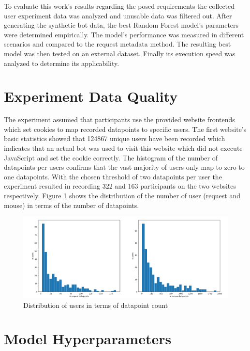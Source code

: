 \documentclass[
    fontsize=12pt,
    headings=small,
    parskip=half,           %
    bibliography=totoc,
    numbers=noenddot,       %
    open=any,               %
    final                   %
]{scrreprt}
\begin{document}
To evaluate this work's results regarding the posed requirements the collected user experiment data was analyzed and unusable data was filtered out. After generating the synthetic bot data, the best Random Forest model's parameters were determined empirically. The model's performance was measured in different scenarios and compared to the request metadata method. The resulting best model was then tested on an external dataset. Finally its execution speed was analyzed to determine its applicability.

\section{Experiment Data Quality}

The experiment assumed that participants use the provided website frontends which set cookies to map recorded datapoints to specific users. The first website's basic statistics showed that 124867 unique users have been recorded which indicates that an actual bot was used to visit this website which did not execute JavaScript and set the cookie correctly. The histogram of the number of datapoints per users confirms that the vast majority of users only map to zero to one datapoints. With the chosen threshold of two datapoints per user the experiment resulted in recording 322 and 163 participants on the two websites respectively. Figure \ref{fig:user_dp_hist} shows the distribution of the number of user (request and mouse) in terms of the number of datapoints.

\begin{figure}[h]
	\includegraphics[width=\textwidth]{figures/user_dp_hist.png}
	\caption{Distribution of users in terms of datapoint count}
	\label{fig:user_dp_hist}
\end{figure}


\section{Model Hyperparameters}
\end{document}
